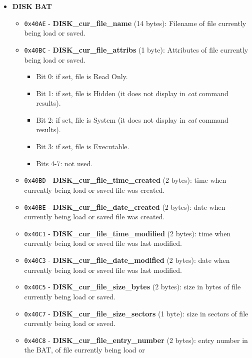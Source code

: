 \documentclass[a4paper,11pt]{article}
\begin{document}
\begin{itemize}
\begin{itemize}
        \end{itemize}
        \item \textbf{DISK BAT}
        \begin{itemize}
            \item \texttt{0x40AE} - \textbf{DISK\_cur\_file\_name} (14 bytes): 
            Filename of file currently being load or saved.
            \item \texttt{0x40BC} - \textbf{DISK\_cur\_file\_attribs} (1 byte):
            Attributes of file currently being load or saved.
            \begin{itemize}
                \item Bit 0: if set, file is Read Only.
                \item Bit 1: if set, file is Hidden (it does not display in
                \textit{cat} command results).
                \item Bit 2: if set, file is System (it does not display in
                \textit{cat} command results).
                \item Bit 3: if set, file is Executable.
                \item Bits 4-7: not used.
            \end{itemize}
            \item \texttt{0x40BD} - \textbf{DISK\_cur\_file\_time\_created} (2
            bytes): time when currently being load or saved file was created.
            \item \texttt{0x40BE} - \textbf{DISK\_cur\_file\_date\_created} (2
            bytes): date when currently being load or saved file was created.
            \item \texttt{0x40C1} - \textbf{DISK\_cur\_file\_time\_modified} (2
            bytes): time when currently being load or saved file was last modified.
            \item \texttt{0x40C3} - \textbf{DISK\_cur\_file\_date\_modified} (2
            bytes): date when currently being load or saved file was last modified.
            \item \texttt{0x40C5} - \textbf{DISK\_cur\_file\_size\_bytes} (2
            bytes): size in bytes of file currently being load or saved.
            \item \texttt{0x40C7} - \textbf{DISK\_cur\_file\_size\_sectors} (1
            byte): size in sectors of file currently being load or saved.
            \item \texttt{0x40C8} - \textbf{DISK\_cur\_file\_entry\_number} (2
            bytes): entry number in the BAT, of file currently being load or

\end{itemize}
\end{itemize}
\end{document}
